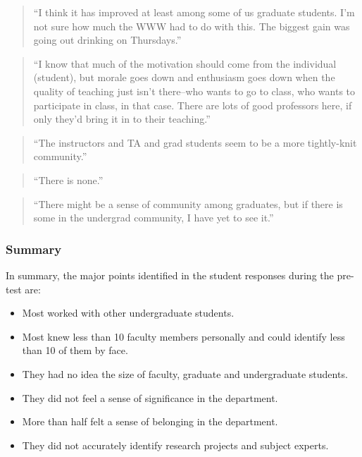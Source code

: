 \begin{quote}
``I think it has improved at least among some of us graduate students.  I'm not
sure how much the WWW had to do with this.  The biggest gain was going out
drinking on Thursdays.''
\end{quote}

\begin{quote}
``I know that much of the motivation should come from the individual (student),
but morale goes down and enthusiasm goes down when the quality of teaching just
isn't there--who wants to go to class, who wants to participate in class, in
that case.  There are lots of good professors here, if only they'd bring it in
to their teaching.''
\end{quote}

\begin{quote}
  ``The instructors and TA and grad students seem to be a more tightly-knit
  community.''
\end{quote}

\begin{quote}
``There is none.''
\end{quote}

\begin{quote}
  ``There might be a sense of community among graduates, but if there is some
  in the undergrad community, I have yet to see it.''
\end{quote}

\subsubsection{Summary}

In summary, the major points identified in the student responses during the
pre-test are:

\begin{itemize}
\item{Most worked with other undergraduate students.}
\item{Most knew less than 10 faculty members personally and could identify
  less than 10 of them by face.}
\item{They had no idea the size of faculty, graduate and undergraduate students.}
\item{They did not feel a sense of significance in the department.}
\item{More than half felt a sense of belonging in the department.}
\item{They did not accurately identify research projects and subject experts.}
\end{itemize}

